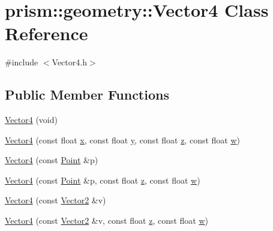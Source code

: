 \hypertarget{classprism_1_1geometry_1_1_vector4}{}\section{prism\+:\+:geometry\+:\+:Vector4 Class Reference}
\label{classprism_1_1geometry_1_1_vector4}


{\ttfamily \#include $<$Vector4.\+h$>$}

\subsection*{Public Member Functions}
\begin{DoxyCompactItemize}
\item 
\hyperlink{classprism_1_1geometry_1_1_vector4_a9c69a4d390612f7c9e5b86774fae63f4}{Vector4} (void)
\item 
\hyperlink{classprism_1_1geometry_1_1_vector4_afdc1a9439ecccb531bceb4c47d83763d}{Vector4} (const float \hyperlink{classprism_1_1geometry_1_1_vector4_ac97118cafe75aaba4749b32f40bbf566}{x}, const float \hyperlink{classprism_1_1geometry_1_1_vector4_aeef667182bad6260883233fb6ed4248a}{y}, const float \hyperlink{classprism_1_1geometry_1_1_vector4_ac6275f95eecc62b403886b32f3b24c5d}{z}, const float \hyperlink{classprism_1_1geometry_1_1_vector4_ad73085ed28fd83da5aa68c6383d94f05}{w})
\item 
\hyperlink{classprism_1_1geometry_1_1_vector4_a74773b21a11e1303de5122b2a8b9ed37}{Vector4} (const \hyperlink{classprism_1_1geometry_1_1_point}{Point} \&p)
\item 
\hyperlink{classprism_1_1geometry_1_1_vector4_ae75b3f176d76f86a5488dabebf3977a0}{Vector4} (const \hyperlink{classprism_1_1geometry_1_1_point}{Point} \&p, const float \hyperlink{classprism_1_1geometry_1_1_vector4_ac6275f95eecc62b403886b32f3b24c5d}{z}, const float \hyperlink{classprism_1_1geometry_1_1_vector4_ad73085ed28fd83da5aa68c6383d94f05}{w})
\item 
\hyperlink{classprism_1_1geometry_1_1_vector4_a892b2f420550d8170aae2a62121b9f78}{Vector4} (const \hyperlink{classprism_1_1geometry_1_1_vector2}{Vector2} \&v)
\item 
\hyperlink{classprism_1_1geometry_1_1_vector4_ac31769d1f44274b1925d904b781772da}{Vector4} (const \hyperlink{classprism_1_1geometry_1_1_vector2}{Vector2} \&v, const float \hyperlink{classprism_1_1geometry_1_1_vector4_ac6275f95eecc62b403886b32f3b24c5d}{z}, const float \hyperlink{classprism_1_1geometry_1_1_vector4_ad73085ed28fd83da5aa68c6383d94f05}{w})

\end{DoxyCompactItemize}
